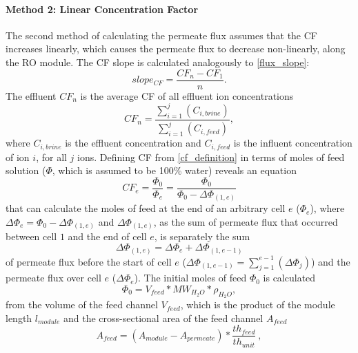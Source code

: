\paragraph{Method 2: Linear Concentration Factor}
The second method of calculating the permeate flux assumes that the CF increases linearly, which causes the permeate flux to decrease non-linearly, along the RO module. The CF slope is calculated analogously to \cref{flux_slope}:
\begin{equation} \label{average_cf_slope}
    slope_{CF} =\frac{CF_{n}-CF_1}{n}.
\end{equation}
The effluent $CF_{n}$ is the average CF of all effluent ion concentrations 
\begin{equation} \label{cf_calculation_output}
    CF_{n}=\frac{\sum_{i=1}^j(C_{i,brine})}{\sum_{i=1}^j(C_{i,feed})},
\end{equation}
where $C_{i,brine}$ is the effluent concentration and $C_{i,feed}$ is the influent concentration of ion $i$, for all $j$ ions. Defining CF from \cref{cf_definition} in terms of moles of feed solution ($\Phi$, which is assumed to be 100\% water) reveals an equation 
\begin{equation} \label{cf_cell_definition}
    CF_e=\frac{\Phi_0}{\Phi_e}=\frac{\Phi_0}{\Phi_0-\Delta \Phi_{(1,e)}}
\end{equation}
that can calculate the moles of feed at the end of an arbitrary cell $e$ ($\Phi_e$), where $\Delta \Phi_{e} = \Phi_0 - \Delta \Phi_{(1,e)}$ and $\Delta \Phi_{(1,e)}$, as the sum of permeate flux that occurred between cell $1$ and the end of cell $e$, is separately the sum
\begin{equation} \label{moles_removed_to_cell}
    \Delta \Phi_{(1,e)}=\Delta \Phi_{e}+\Delta \Phi_{(1,e-1)}
\end{equation}
of permeate flux before the start of cell $e$ ($\Delta \Phi_{(1,e-1)}=\sum_{j=1}^{e-1}(\Delta \Phi_{j})$) and the permeate flux over cell $e$ ($\Delta \Phi_{e}$). The initial moles of feed $\Phi_0$ is calculated
\begin{equation} \label{feed_mass}
    \Phi_0=V_{feed}*MW_{H_2O}*\rho_{H_2O},
\end{equation}
from the volume of the feed channel $V_{feed}$, which is the product of the module length $l_{module}$ and the cross-sectional area of the feed channel $A_{feed}$
\begin{equation} \label{feed_area}
    A_{feed}=(A_{module}-A_{permeate})*\frac{th_{feed}}{th_{unit}}~,
\end{equation}
